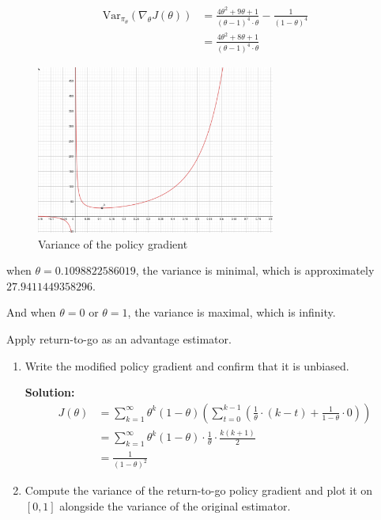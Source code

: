 \documentclass{article}
\begin{document}
\begin{enumerate}
    $$
    \begin{aligned}
    \text{Var}_{\pi_{\theta}} \left( \nabla_{\theta} J(\theta) \right) &= \frac{4\theta^2 + 9\theta + 1}{(\theta-1)^4 \cdot \theta} - \frac{1}{(1-\theta)^4} \\
    &= \frac{4\theta^2 + 8\theta + 1}{(\theta-1)^4 \cdot \theta}
    \end{aligned}
    $$

    \begin{figure}[H]
    \centering
    \includegraphics[width=0.7\textwidth]{img/PG_variance.jpg}
    \caption{Variance of the policy gradient}
    \label{fig:PG_variance}
    \end{figure}

    when $\theta = 0.1098822586019$, the variance is minimal, which is approximately $27.9411449358296$.

    And when $\theta = 0$ or $\theta = 1$, the variance is maximal, which is infinity.


\newpage
{} Apply return-to-go as an advantage estimator.
\begin{enumerate}
    \item Write the modified policy gradient and confirm that it is unbiased.
    
    \textbf{Solution:}
    $$
    \begin{aligned}
    J(\theta) &= \sum_{k=1}^{\infty} \theta^k (1-\theta) \left( \sum_{t=0}^{k-1} \left( \frac{1}{\theta} \cdot (k-t) + \frac{1}{1-\theta} \cdot 0 \right) \right) \\
    &= \sum_{k=1}^{\infty} \theta^k (1-\theta) \cdot \frac{1}{\theta} \cdot \frac{k(k+1)}{2} \\
    &= \frac{1}{(1-\theta)^2}
    \end{aligned}
    $$

    \item Compute the variance of the return-to-go policy gradient and plot it on $[0, 1]$ alongside the variance of the original estimator.


\end{enumerate}
\end{enumerate}
\end{document}

